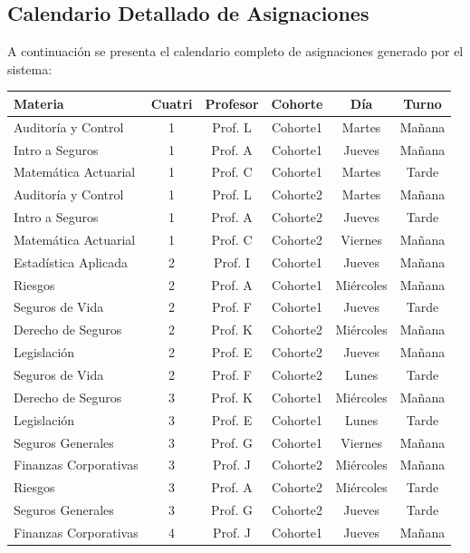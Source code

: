 \newpage
\subsection{Calendario Detallado de Asignaciones}

A continuación se presenta el calendario completo de asignaciones generado por el sistema:

\begin{table}[htbp]
\centering
\small
\begin{tabular}{|p{3cm}|c|c|c|c|c|}
\hline
\textbf{Materia} & \textbf{Cuatri} & \textbf{Profesor} & \textbf{Cohorte} & \textbf{Día} & \textbf{Turno} \\
\hline
Auditoría y Control & 1 & Prof. L & Cohorte1 & Martes & Mañana \\
Intro a Seguros & 1 & Prof. A & Cohorte1 & Jueves & Mañana \\
Matemática Actuarial & 1 & Prof. C & Cohorte1 & Martes & Tarde \\
Auditoría y Control & 1 & Prof. L & Cohorte2 & Martes & Mañana \\
Intro a Seguros & 1 & Prof. A & Cohorte2 & Jueves & Tarde \\
Matemática Actuarial & 1 & Prof. C & Cohorte2 & Viernes & Mañana \\
\hline
Estadística Aplicada & 2 & Prof. I & Cohorte1 & Jueves & Mañana \\
Riesgos & 2 & Prof. A & Cohorte1 & Miércoles & Mañana \\
Seguros de Vida & 2 & Prof. F & Cohorte1 & Jueves & Tarde \\
Derecho de Seguros & 2 & Prof. K & Cohorte2 & Miércoles & Mañana \\
Legislación & 2 & Prof. E & Cohorte2 & Jueves & Mañana \\
Seguros de Vida & 2 & Prof. F & Cohorte2 & Lunes & Tarde \\
\hline
Derecho de Seguros & 3 & Prof. K & Cohorte1 & Miércoles & Mañana \\
Legislación & 3 & Prof. E & Cohorte1 & Lunes & Tarde \\
Seguros Generales & 3 & Prof. G & Cohorte1 & Viernes & Mañana \\
Finanzas Corporativas & 3 & Prof. J & Cohorte2 & Miércoles & Mañana \\
Riesgos & 3 & Prof. A & Cohorte2 & Miércoles & Tarde \\
Seguros Generales & 3 & Prof. G & Cohorte2 & Jueves & Tarde \\
\hline
Finanzas Corporativas & 4 & Prof. J & Cohorte1 & Jueves & Mañana \\

\end{tabular}
\end{table}
